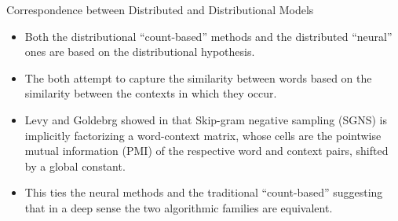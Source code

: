 \documentclass[handout]{beamer}
\begin{document}
\begin{frame}{Correspondence between Distributed and Distributional Models}
\begin{scriptsize}
\begin{itemize}
       
\item Both the distributional ``count-based'' methods and the distributed ``neural'' ones are based on the distributional hypothesis.

\item The both attempt to capture the similarity between words based on the similarity between the contexts in which they occur.      
       
\item Levy and Goldebrg showed in \cite{levy2014neural} that Skip-gram negative sampling (SGNS) is implicitly factorizing a word-context matrix, whose cells are the pointwise mutual information (PMI) of the respective word and context pairs, shifted by a global constant. 


\item This ties the neural methods and the traditional ``count-based'' suggesting that in a deep sense
the two algorithmic families are equivalent.
     
\end{itemize}
\end{scriptsize}
\end{frame}
\end{document}
